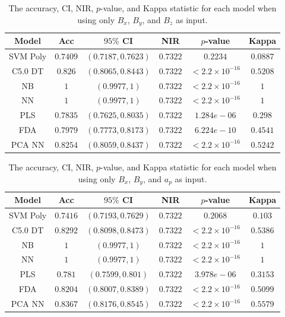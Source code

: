 \documentclass[sn-mathphys-num]{sn-jnl}%
\begin{document}
\begin{table}[!ht]
    \centering
    \caption{The accuracy, CI, NIR, $p$-value, and Kappa statistic for each model when using only $B_{x}$, $B_{y}$, and $B_{z}$ as input.}
	\label{tab:stats:reverse:coord}
	\begin{tabular}{|c|c|c|c|c|c|}
		\hline
		Model & Acc & $95\%$ CI & NIR & $p$-value & Kappa \\ \hline
		SVM Poly & $0.7409$ & $(0.7187, 0.7623)$ & $0.7322$ & $0.2234$ & $0.0887$ \\ \hline
		C5.0 DT & $0.826$ & $(0.8065, 0.8443)$ & $0.7322$ & $< 2.2 \times {10}^{-16}$ & $0.5208$ \\ \hline
		NB & $1$ & $(0.9977, 1)$ & $0.7322$ & $< 2.2 \times {10}^{-16}$ & $1$ \\ \hline
		NN & $1$ & $(0.9977, 1)$ & $0.7322$ & $< 2.2 \times {10}^{-16}$ & $1$ \\ \hline
		PLS & $0.7835$ & $(0.7625, 0.8035)$ & $0.7322$ & $1.284e-06$ & $0.298$ \\ \hline
		FDA & $0.7979$ & $(0.7773, 0.8173)$ & $0.7322$ & $6.224e-10$ & $0.4541$ \\ \hline
		PCA NN & $0.8254$ & $(0.8059, 0.8437)$ & $0.7322$ & $< 2.2 \times {10}^{-16}$ & $0.5242$ \\ \hline
	\end{tabular}
\end{table}

\begin{table}[!ht]
    \centering
    \caption{The accuracy, CI, NIR, $p$-value, and Kappa statistic for each model when using only $B_{x}$, $B_{y}$, and $a_{p}$ as input.}
	\label{tab:stats:reverse:xyap}
	\begin{tabular}{|c|c|c|c|c|c|}
		\hline
		Model & Acc & $95\%$ CI & NIR & $p$-value & Kappa \\ \hline
		SVM Poly & $0.7416$ & $(0.7193, 0.7629)$ & $0.7322$ & $0.2068$ & $0.103$ \\ \hline
		C5.0 DT & $0.8292$ & $(0.8098, 0.8473)$ & $0.7322$ & $< 2.2 \times {10}^{-16}$ & $0.5386$ \\ \hline
		NB & $1$ & $(0.9977, 1)$ & $0.7322$ & $< 2.2 \times {10}^{-16}$ & $1$ \\ \hline
		NN & $1$ & $(0.9977, 1)$ & $0.7322$ & $< 2.2 \times {10}^{-16}$ & $1$ \\ \hline
		PLS & $0.781$ & $(0.7599, 0.801)$ & $0.7322$ & $3.978e-06$ & $0.3153$ \\ \hline
		FDA & $0.8204$ & $(0.8007, 0.8389)$ & $0.7322$ & $< 2.2 \times {10}^{-16}$ & $0.5099$ \\ \hline
		PCA NN & $0.8367$ & $(0.8176, 0.8545)$ & $0.7322$ & $< 2.2 \times {10}^{-16}$ & $0.5579$ \\ \hline
	\end{tabular}
\end{table}
\end{document}
